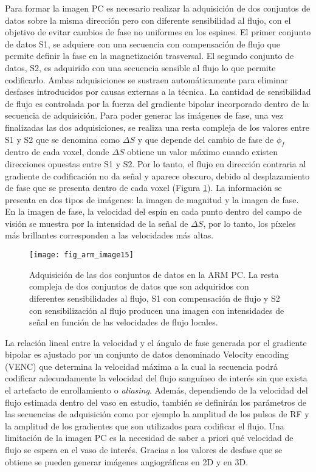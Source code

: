 Para formar la imagen PC es necesario realizar la adquisición de dos conjuntos de datos sobre la misma dirección pero con diferente sensibilidad al flujo, con el objetivo de evitar cambios de fase no uniformes en los espines. El primer conjunto de datos S1, se adquiere con una secuencia con compensación de flujo que permite definir la fase en la magnetización trasversal. El segundo conjunto de datos, S2, es adquirido con una secuencia sensible al flujo lo que permite codificarlo. Ambas adquisiciones se sustraen automáticamente para eliminar desfases introducidos por causas externas a la técnica. La cantidad de sensibilidad de flujo es controlada por la fuerza del gradiente bipolar incorporado dentro de la secuencia de adquisición. 
Para poder generar las imágenes de fase, una vez finalizadas las dos adquisiciones, se realiza una resta compleja de los valores entre S1 y S2 que se denomina como $\Delta{S}$ y que depende del cambio de fase de $\phi_f$ dentro de cada voxel, donde $\Delta{S}$ obtiene un valor máximo cuando existen direcciones opuestas entre S1 y S2. Por lo tanto, el flujo en dirección contraria al gradiente de codificación no da señal y aparece obscuro, debido al desplazamiento de fase que se presenta dentro de cada voxel (Figura \ref{fig:arm_image15}). La información se presenta en dos tipos de imágenes: la imagen de magnitud y la imagen de fase. En la imagen de fase, la velocidad del espín en cada punto dentro del campo de visión se muestra por la intensidad de la señal de $\Delta{S}$, por lo tanto, los píxeles más brillantes corresponden a las velocidades más altas. 



\begin{figure}[htbp]
\begin{figg}
 \texttt{[image: fig\_arm\_image15]}
 \caption{
Adquisición de las dos conjuntos de datos en la ARM PC. La resta compleja de dos conjuntos de datos que son adquiridos con diferentes sensibilidades al flujo, S1 con compensación de flujo y S2 con sensibilización al flujo producen una imagen con intensidades de señal en función de las velocidades de flujo locales.
 }
 \label{fig:arm_image15}
\end{figg}
\end{figure}



La relación lineal entre la velocidad y el ángulo de fase generada por el gradiente bipolar es ajustado por un conjunto de datos denominado Velocity encoding (VENC) que determina la velocidad máxima a la cual la secuencia podrá codificar adecuadamente la velocidad del flujo sanguíneo de interés sin que exista el artefacto de enrollamiento o \textit{aliasing}. Además, dependiendo de la velocidad del flujo estimada dentro del vaso en estudio, también se definirán los parámetros de las secuencias de adquisición como por ejemplo la amplitud de los pulsos de RF y la amplitud de los gradientes que son utilizados para codificar el flujo. Una limitación de la imagen PC es la necesidad de saber a priori qué velocidad de flujo se espera en el vaso de interés. Gracias a los valores de desfase que se obtiene se pueden generar imágenes angiográficas en 2D y en 3D. 

